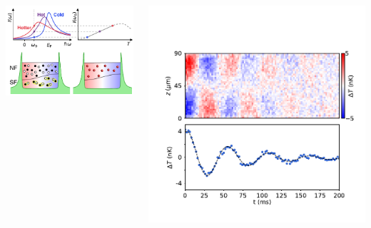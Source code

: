 \documentclass[26pt, paperwidth=36in,paperheight=48in]{tikzposter} %
\begin{document}
\begin{columns}
{\begin{minipage}{0.15\textwidth}
			\hspace{0.5cm}\includegraphics[width=10cm,
			trim=4.4cm 0cm 0cm 3.2cm,clip]{figures/local_thermometer_redone.pdf}
		\end{minipage}
		\hspace{-3.5cm}
		\begin{minipage}{0.2\textwidth}
			\vspace{-2cm}
			\includegraphics[width=17cm,
			trim=0cm 5.2cm 0cm 0cm,clip]{figures/TimeEvolution_Slides_noedge.pdf}\\

\end{minipage}}
\end{columns}
\end{document}
